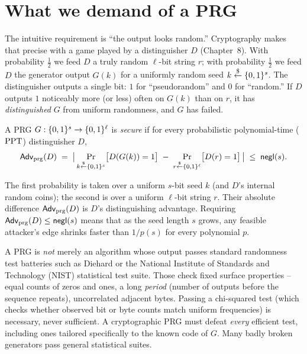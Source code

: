 \section{What we demand of a PRG}
\label{ch10:prg-security}

The intuitive requirement is ``the output looks random.'' Cryptography makes that precise with a game played by a distinguisher $D$ (Chapter~8). With probability $\tfrac12$ we feed $D$ a truly random $\ell$-bit string $r$; with probability $\tfrac12$ we feed $D$ the generator output $G(k)$ for a uniformly random seed $k \getsr \set{0,1}^s$. The distinguisher outputs a single bit: $1$ for ``pseudorandom'' and $0$ for ``random.'' If $D$ outputs $1$ noticeably more (or less) often on $G(k)$ than on $r$, it has \emph{distinguished} $G$ from uniform randomness, and $G$ has failed.

\begin{definition}
\label{ch10:def-prg-secure}
A PRG $G:\set{0,1}^s \to \set{0,1}^{\ell}$ is \emph{secure} if for every probabilistic polynomial-time ($\PPT$) distinguisher $D$,
\[
  \Adv_{\mathrm{prg}}(D)
  \;=\;
  \abs[\big]{\,
    \Pr_{k \getsr \set{0,1}^s}\!\big[D(G(k)) = 1\big]
    \;-\;
    \Pr_{r \getsr \set{0,1}^{\ell}}\!\big[D(r) = 1\big]
  \,}
  \;\le\; \negl(s).
\]
\end{definition}

The first probability is taken over a uniform $s$-bit seed $k$ (and $D$'s internal random coins); the second is over a uniform $\ell$-bit string $r$. Their absolute difference $\Adv_{\mathrm{prg}}(D)$ is $D$'s distinguishing advantage. Requiring $\Adv_{\mathrm{prg}}(D) \le \negl(s)$ means that as the seed length $s$ grows, any feasible attacker's edge shrinks faster than $1/p(s)$ for every polynomial $p$.

\begin{trapbox}
A PRG is \emph{not} merely an algorithm whose output passes standard randomness test batteries such as Diehard or the National Institute of Standards and Technology (NIST) statistical test suite. Those check fixed surface properties -- equal counts of zeros and ones, a long \emph{period} (number of outputs before the sequence repeats), uncorrelated adjacent bytes. Passing a chi-squared test (which checks whether observed bit or byte counts match uniform frequencies) is necessary, never sufficient. A cryptographic PRG must defeat \emph{every} efficient test, including ones tailored specifically to the known code of $G$. Many badly broken generators pass general statistical suites.
\end{trapbox}

